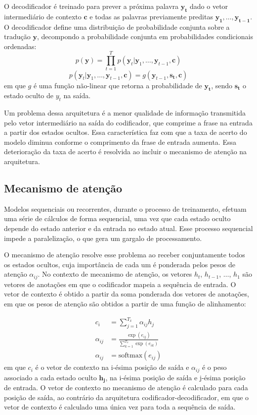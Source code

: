O decodificador é treinado para prever a próxima palavra $\mathbf{y_t}$ dado o
vetor intermediário de contexto $\mathbf{c}$ e todas as palavras previamente preditas
$\mathbf{y_1}, \ldots, \mathbf{y_{t-1}}$. O decodificador define uma
distribuição de probabilidade conjunta sobre a tradução $\mathbf{y}$, decompondo
a probabilidade conjunta em probabilidades condicionais ordenadas:
\begin{equation}
    p(\mathbf{y}) = \prod_{t=1}^T p(\textbf{y}_t | \textbf{y}_1, \ldots, \textbf{y}_{t-1}, \mathbf{c})
\end{equation}
\begin{equation}
    p(\textbf{y}_t | \textbf{y}_1, \ldots, \textbf{y}_{t-1}, \mathbf{c}) = g(\textbf{y}_{t-1}, \mathbf{s_t}, \mathbf{c})
\end{equation}
em que $g$ é uma função não-linear que retorna a probabilidade de
$\mathbf{y_t}$, sendo $\mathbf{s_t}$ o estado oculto de $y_t$ na saída.

Um problema dessa arquitetura é a menor qualidade de informação transmitida pelo
vetor intermediário na saída do codificador, que comprime a frase na entrada a
partir dos estados ocultos. Essa característica faz com que a taxa de acerto do
modelo diminua conforme o comprimento da frase de entrada aumenta. Essa
deterioração da taxa de acerto é resolvida ao incluir o mecanismo de atenção
na arquitetura.

\subsection{Mecanismo de atenção}
Modelos sequenciais ou recorrentes, durante o processo de treinamento, efetuam
uma série de cálculos de forma sequencial, uma vez que cada estado oculto depende do estado anterior e da entrada no
estado atual. Esse processo sequencial impede a paralelização, o
que gera um gargalo de processamento.

O mecanismo de atenção \cite{bahdanau2016neural} resolve esse problema ao
receber conjuntamente todos os estados ocultos, cuja importância de cada um é
ponderada pelos pesos de atenção $\alpha_{ij}$. No contexto de mecanismo
de atenção, os vetores $h_t$, $h_{t-1}$, $\ldots$, $h_1$ são vetores de anotações em que o codificador mapeia a sequência de entrada. O vetor de contexto é obtido a partir da soma ponderada dos vetores de anotações, em que os pesos de atenção são obtidos a partir de uma função de alinhamento:


\begin{align}
    c_i &= \sum_{j=1}^{T_x} \alpha_{ij} h_j \\
    \alpha_{ij} &= \frac{\exp(e_{ij})}{\sum_{k=1}^{T_x} \exp(e_{ik})} \\
    \alpha_{ij} &=  \text{softmax}(e_{ij})
\end{align}
em que $c_i$ é o vetor de contexto na i-ésima posição de saída e $\alpha_{ij}$ é
o peso associado a cada estado oculto $\mathbf{h_j}$, na i-ésima posição de
saída e j-ésima posição de entrada. O vetor de contexto no mecanismo de atenção é calculado para cada posição de saída, ao contrário
da arquitetura codificador-decodificador, em que o vetor de contexto é calculado uma única vez para toda a sequência de saída.


